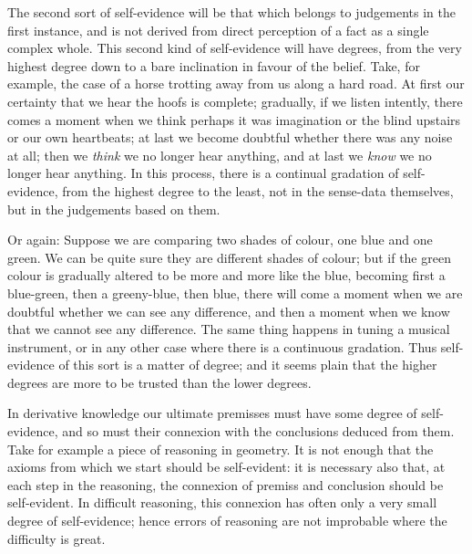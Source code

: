 \documentclass[oneside,letterpaper,12pt]{book}
\begin{document}
The second sort of self-evidence will be that which belongs to
judgements in the first instance, and is not derived from direct
perception of a fact as a single complex whole. This second kind of
self-evidence will have degrees, from the very highest degree down to a
bare inclination in favour of the belief. Take, for example, the case of
a horse trotting away from us along a hard road. At first our certainty
that we hear the hoofs is complete; gradually, if we listen intently,
there comes a moment when we think perhaps it was imagination or the
blind upstairs or our own heartbeats; at last we become doubtful whether
there was any noise at all; then we \emph{think} we no longer hear
anything, and at last we \emph{know} we no longer hear anything. In this
process, there is a continual gradation of self-evidence, from the
highest degree to the least, not in the sense-data themselves, but in
the judgements based on them.

Or again: Suppose we are comparing two shades of colour, one blue and
one green. We can be quite sure they are different shades of colour; but
if the green colour is gradually altered to be more and more like the
blue, becoming first a blue-green, then a greeny-blue, then blue, there
will come a moment when we are doubtful whether we can see any
difference, and then a moment when we know that we cannot see any
difference. The same thing happens in tuning a musical instrument, or in
any other case where there is a continuous gradation. Thus self-evidence
of this sort is a matter of degree; and it seems plain that the higher
degrees are more to be trusted than the lower degrees.

In derivative knowledge our ultimate premisses must have some degree of
self-evidence, and so must their connexion with the conclusions deduced
from them. \label{connected} Take for example a piece of reasoning in geometry. It is not
enough that the axioms from which we start should be self-evident: it is
necessary also that, at each step in the reasoning, the connexion of
premiss and conclusion should be self-evident. In difficult reasoning,
this connexion has often only a very small degree of self-evidence;
hence errors of reasoning are not improbable where the difficulty is
great.
\end{document}
